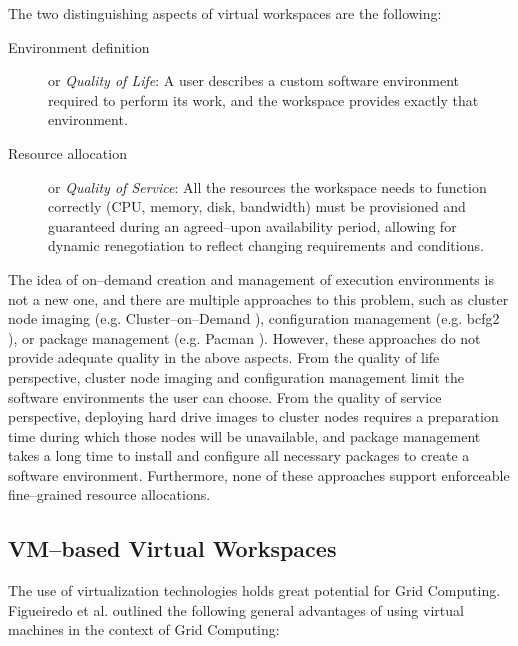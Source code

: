 \documentclass[singlespace]{ccw_chithesis}
\begin{document}
The two distinguishing aspects of virtual workspaces are the following:

\begin{description}
\item[Environment definition] or \emph{Quality of Life}: A user describes a custom software environment required to perform its work, and the workspace provides exactly that environment.
\item[Resource allocation] or \emph{Quality of Service}: All the resources the workspace needs to function correctly (CPU, memory, disk, bandwidth) must be provisioned and guaranteed during an agreed--upon availability period, allowing for dynamic renegotiation to reflect changing requirements and conditions.
\end{description}

The idea of on--demand creation and management of execution environments is not a new one, and there are multiple approaches to this problem, such as cluster node imaging (e.g. Cluster--on--Demand \cite{codweb}), configuration management (e.g. bcfg2 \cite{bcfg2web}), or package management (e.g. Pacman \cite{pacmanweb}). However, these approaches do not provide adequate quality in the above aspects. From the quality of life perspective, cluster node imaging and configuration management limit the software environments the user can choose. From the quality of service perspective, deploying hard drive images to cluster nodes requires a preparation time during which those nodes will be unavailable, and package management takes a long time to install and configure all necessary packages to create a software environment. Furthermore, none of these approaches support enforceable fine--grained resource allocations.


\subsection{VM--based Virtual Workspaces}
\label{sec:vm}

The use of virtualization technologies \cite{vmbook} holds great potential for Grid Computing. Figueiredo et al. \cite{gridvm} outlined the following general advantages of using virtual machines in the context of Grid Computing:
\end{document}
